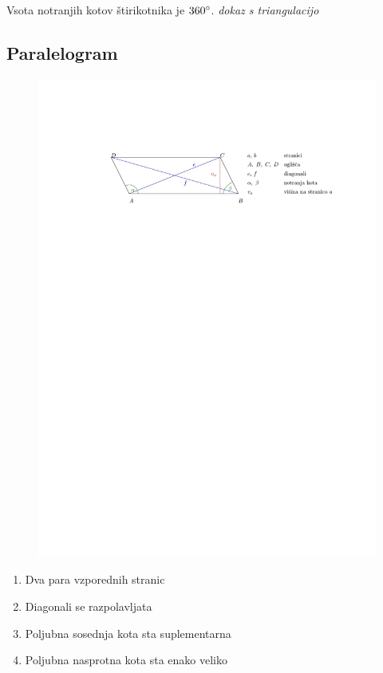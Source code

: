 \documentclass{article}
\begin{document}
Vsota notranjih kotov štirikotnika je $360\degree$. \textit{dokaz s triangulacijo}

\subsection*{Paralelogram}

\begin{figure}[H]
    \includegraphics[width=1\textwidth]{paralelogram.pdf}
    \centering
\end{figure}

\begin{enumerate}[i]
    \item Dva para vzporednih stranic
    \item Diagonali se razpolavljata
    \item Poljubna sosednja kota sta suplementarna
    \item Poljubna nasprotna kota sta enako veliko
  \end{enumerate}
\end{document}
